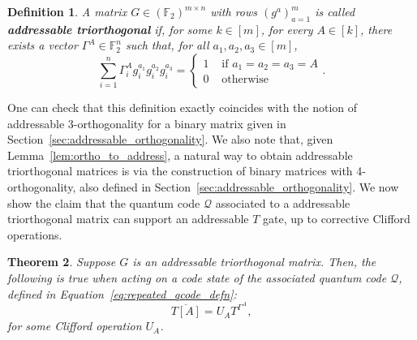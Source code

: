 \documentclass[11pt]{article}
\newtheorem{theorem}{Theorem}[section]
\newtheorem{definition}[theorem]{Definition}
\theoremstyle{definition}
\newcommand{\qcode}{\mathcal{Q}}
\begin{document}
\begin{definition}\label{def:addressable_triorthogonality}
    A matrix $G \in (\mathbb{F}_2)^{m \times n}$ with rows $(g^a)_{a=1}^m$ is called \textbf{addressable triorthogonal} if, for some $k \in [m]$, for every $A \in [k]$, there exists a vector $\Gamma^A \in \mathbb{F}_2^n$ such that, for all $a_1, a_2, a_3 \in [m]$,
    \begin{equation}
        \sum_{i=1}^n\Gamma_i^Ag_i^{a_1}g_i^{a_2}g_i^{a_3} = \begin{cases}
            1 &\text{ if } a_1 = a_2 = a_3 = A\\
            0 &\text{ otherwise}
        \end{cases}.
    \end{equation}
\end{definition}
One can check that this definition exactly coincides with the notion of addressable 3-orthogonality for a binary matrix given in Section~\ref{sec:addressable_orthogonality}. We also note that, given Lemma~\ref{lem:ortho_to_address}, a natural way to obtain addressable triorthogonal matrices is via the construction of binary matrices with 4-orthogonality, also defined in Section~\ref{sec:addressable_orthogonality}. We now show the claim that the quantum code $\qcode$ associated to a addressable triorthogonal matrix can support an addressable $T$ gate, up to corrective Clifford operations.
\begin{theorem}
    Suppose $G$ is an addressable triorthogonal matrix. Then, the following is true when acting on a code state of the associated quantum code $\qcode$, defined in Equation~\eqref{eq:repeated_qcode_defn}:
    \begin{equation}
        \overline{T[A]} = U_AT^{\Gamma^A},
    \end{equation}
    for some Clifford operation $U_A$.
\end{theorem}
\end{document}

